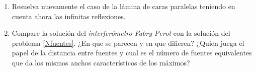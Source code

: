 \documentclass[11pt,spanish,a4paper]{article}
\begin{document}
\begin{enumerate}
\item Resuelva nuevamente el caso de la lámina de caras paralelas teniendo en cuenta ahora las infinitas reflexiones.


\item Compare la solución del \textit{interferómetro Fabry-Perot} con la solución del problema \ref{Nfuentes}.
	¿En que se parecen y en que difieren? ¿Quien juega el papel de la distancia entre fuentes y cual es el número de fuentes equivalentes que da los mismos anchos característicos de los máximos?

\end{enumerate}
\end{document}
